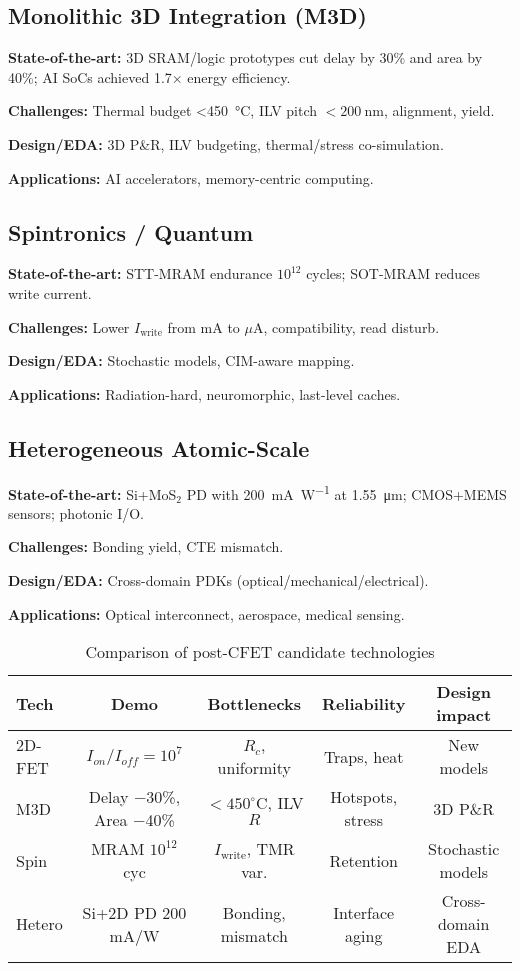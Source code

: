 \documentclass[conference]{IEEEtran}
\begin{document}
\subsection{Monolithic 3D Integration (M3D)}
\textbf{State-of-the-art:}
3D SRAM/logic prototypes cut delay by 30\% and area by 40\%; AI SoCs achieved 1.7$\times$ energy efficiency.

\textbf{Challenges:}
Thermal budget \SI{<450}{\celsius}, ILV pitch $<\SI{200}{\nano\meter}$, alignment, yield.

\textbf{Design/EDA:}
3D P\&R, ILV budgeting, thermal/stress co-simulation.

\textbf{Applications:}
AI accelerators, memory-centric computing.

\subsection{Spintronics / Quantum}
\textbf{State-of-the-art:}
STT-MRAM endurance $10^{12}$ cycles; SOT-MRAM reduces write current.

\textbf{Challenges:}
Lower $I_\text{write}$ from mA to $\mu$A, compatibility, read disturb.

\textbf{Design/EDA:}
Stochastic models, CIM-aware mapping.

\textbf{Applications:}
Radiation-hard, neuromorphic, last-level caches.

\subsection{Heterogeneous Atomic-Scale}
\textbf{State-of-the-art:}
Si+MoS$_2$ PD with \SI{200}{\milli\ampere\per\watt} at \SI{1.55}{\micro\meter}; CMOS+MEMS sensors; photonic I/O.

\textbf{Challenges:}
Bonding yield, CTE mismatch.

\textbf{Design/EDA:}
Cross-domain PDKs (optical/mechanical/electrical).

\textbf{Applications:}
Optical interconnect, aerospace, medical sensing.

\begin{table}[!t]
\centering
\caption{Comparison of post-CFET candidate technologies}
\label{tab:comparison}
\begin{tabular}{@{}lcccc@{}}
\toprule
Tech & Demo & Bottlenecks & Reliability & Design impact \\
\midrule
2D-FET & $I_{on}/I_{off}=10^7$ & $R_c$, uniformity & Traps, heat & New models \\
M3D & Delay −30\%, Area −40\% & $<450^\circ$C, ILV $R$ & Hotspots, stress & 3D P\&R \\
Spin & MRAM $10^{12}$ cyc & $I_\text{write}$, TMR var. & Retention & Stochastic models \\
Hetero & Si+2D PD 200 mA/W & Bonding, mismatch & Interface aging & Cross-domain EDA \\
\bottomrule
\end{tabular}
\end{table}
\end{document}
